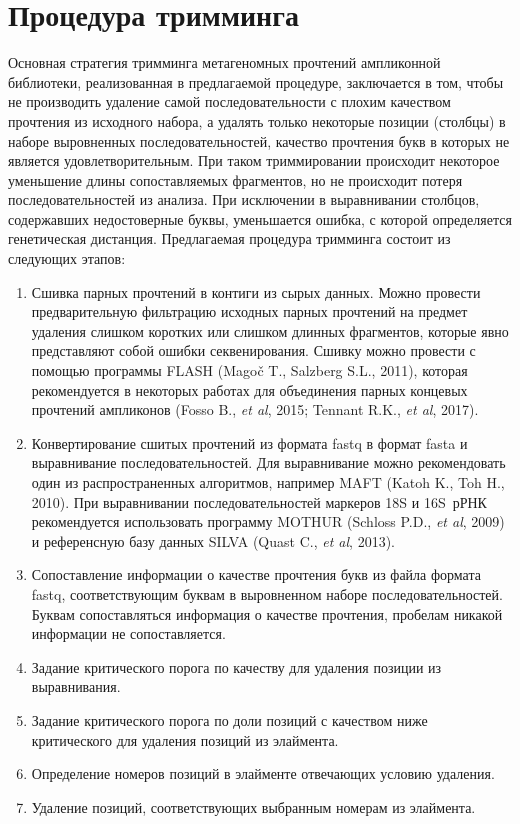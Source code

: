 \documentclass[a4paper,12pt,openany,final]{extreport}
\begin{document}
\section{Процедура тримминга}
Основная стратегия тримминга метагеномных прочтений ампликонной библиотеки, реализованная в предлагаемой процедуре, заключается в том, чтобы не производить удаление самой последовательности с плохим качеством прочтения из исходного набора, а удалять только некоторые позиции (столбцы) в наборе выровненных последовательностей, качество прочтения букв в которых не является удовлетворительным. При таком триммировании происходит некоторое уменьшение длины сопоставляемых фрагментов, но не происходит потеря последовательностей из анализа. При исключении в выравнивании столбцов, содержавших недостоверные буквы, уменьшается ошибка, с которой определяется генетическая дистанция.  Предлагаемая процедура тримминга состоит из следующих этапов:

\begin{enumerate}
\item Сшивка парных прочтений в контиги из сырых данных. Можно провести предварительную фильтрацию исходных парных прочтений на предмет удаления слишком коротких или слишком длинных фрагментов, которые явно представляют собой ошибки секвенирования. Сшивку можно провести с помощью программы FLASH (Magoč T., Salzberg S.L., 2011), которая рекомендуется в некоторых работах для объединения парных концевых прочтений ампликонов (Fosso B., \textit{et al}, 2015; Tennant R.K., \textit{et al}, 2017).

\item Конвертирование сшитых прочтений из формата fastq в формат fasta и выравнивание последовательностей. Для выравнивание можно рекомендовать один из распространенных алгоритмов, например MAFT (Katoh K., Toh H., 2010). При выравнивании последовательностей маркеров 18S и 16S~рРНК рекомендуется использовать программу MOTHUR (Schloss P.D., \textit{et al}, 2009) и референсную базу данных SILVA (Quast C., \textit{et al}, 2013).

\item Сопоставление информации о качестве прочтения букв из файла формата fastq, соответствующим буквам в выровненном наборе последовательностей.  Буквам сопоставляться информация о качестве прочтения, пробелам никакой информации не сопоставляется.

\item Задание критического порога по качеству для удаления позиции из выравнивания.

\item Задание критического порога по доли позиций с качеством ниже критического для удаления позиций из элаймента.

\item Определение номеров позиций в элайменте отвечающих условию удаления.

\item Удаление позиций, соответствующих выбранным номерам из элаймента.
\end{enumerate}
\end{document}
